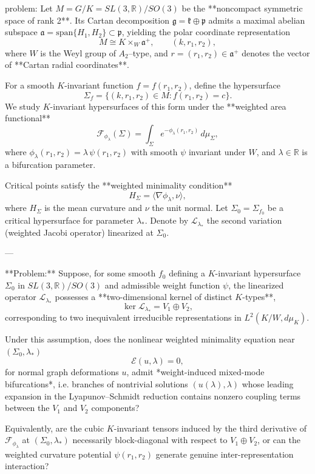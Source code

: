 problem:  
Let \( M = G/K = SL(3,\mathbb{R})/SO(3) \) be the **noncompact symmetric space of rank 2**.  
Its Cartan decomposition \( \mathfrak{g} = \mathfrak{k} \oplus \mathfrak{p} \) admits a maximal abelian subspace \( \mathfrak{a} = \mathrm{span}\{H_1,H_2\} \subset \mathfrak{p}\), yielding the polar coordinate representation  
\[
M \cong K \times_{W} \mathfrak{a}^+, \qquad (k, r_1, r_2),
\]
where \(W\) is the Weyl group of \( A_2 \)–type, and \(r=(r_1,r_2)\in \mathfrak{a}^+\) denotes the vector of **Cartan radial coordinates**.

For a smooth \(K\)-invariant function \( f=f(r_1,r_2)\), define the hypersurface
\[
\Sigma_f = \{ (k,r_1,r_2) \in M : f(r_1,r_2) = c \}.
\]
We study \(K\)-invariant hypersurfaces of this form under the **weighted area functional**
\[
\mathcal{F}_{\phi_\lambda}(\Sigma) = \int_{\Sigma} e^{-\phi_\lambda(r_1,r_2)}\, d\mu_\Sigma,
\]
where \( \phi_\lambda(r_1,r_2) = \lambda\, \psi(r_1,r_2)\) with smooth \( \psi \) invariant under \(W\), and \( \lambda \in \mathbb{R}\) is a bifurcation parameter.

Critical points satisfy the **weighted minimality condition**
\[
H_\Sigma = \langle \nabla \phi_\lambda, \nu \rangle,
\]
where \(H_\Sigma\) is the mean curvature and \(\nu\) the unit normal.  
Let \(\Sigma_0 = \Sigma_{f_0}\) be a critical hypersurface for parameter \(\lambda_* \).  
Denote by \(\mathcal{L}_{\lambda_*}\) the second variation (weighted Jacobi operator) linearized at \(\Sigma_0\).

---

**Problem:**  
Suppose, for some smooth \(f_0\) defining a \(K\)-invariant hypersurface \(\Sigma_0\) in \(SL(3,\mathbb{R})/SO(3)\) and admissible weight function \(\psi\), the linearized operator \(\mathcal{L}_{\lambda_*}\) possesses a **two-dimensional kernel of distinct \(K\)-types**,
\[
\ker \mathcal{L}_{\lambda_*} = V_1 \oplus V_2,
\]
corresponding to two inequivalent irreducible representations in \(L^2(K/W, d\mu_K)\).  

Under this assumption, does the nonlinear weighted minimality equation near \((\Sigma_0,\lambda_*)\)
\[
\mathcal{E}(u,\lambda)=0,
\]
for normal graph deformations \(u\), admit *weight-induced mixed-mode bifurcations*, i.e. branches of nontrivial solutions \((u(\lambda),\lambda)\) whose leading expansion in the Lyapunov–Schmidt reduction contains nonzero coupling terms between the \(V_1\) and \(V_2\) components?  

Equivalently, are the cubic \(K\)-invariant tensors induced by the third derivative of \(\mathcal{F}_{\phi_\lambda}\) at \((\Sigma_0,\lambda_*)\) necessarily block-diagonal with respect to \(V_1\oplus V_2\), or can the weighted curvature potential \(\psi(r_1,r_2)\) generate genuine inter-representation interaction?  

